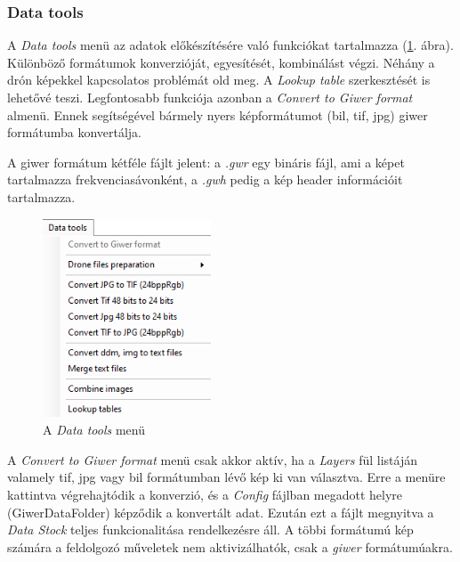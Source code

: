 \documentclass[a4paper,12pt]{article}
\begin{document}
\subsubsection{Data tools}

A \textit{Data tools} menü az adatok előkészítésére való funkciókat tartalmazza (\ref{fig:datatools_menu}. ábra). Különböző formátumok konverzióját, egyesítését, kombinálást végzi. Néhány a drón képekkel kapcsolatos problémát old meg. A \textit{Lookup table} szerkesztését is lehetővé teszi. Legfontosabb funkciója azonban a \textit{Convert to Giwer format} almenü. Ennek segítségével bármely nyers képformátumot (bil, tif, jpg) giwer formátumba konvertálja. 

A giwer formátum kétféle fájlt jelent: a \textit{.gwr} egy bináris fájl, ami a képet tartalmazza frekvenciasávonként, a \textit{.gwh} pedig a kép header információit tartalmazza.

	\begin{figure}
		\centering
		\includegraphics[width=5cm]{datatools_menu.png}
		\caption{A \textit{Data tools} menü}
		\label{fig:datatools_menu}
	\end{figure}


A \textit{Convert to Giwer format} menü csak akkor aktív, ha a \textit{Layers} fül listáján valamely tif, jpg vagy bil formátumban lévő kép ki van választva. Erre a menüre kattintva végrehajtódik a konverzió, és a \textit{Config} fájlban megadott helyre (GiwerDataFolder) képződik a konvertált adat. Ezután ezt a fájlt megnyitva a \textit{Data Stock} teljes funkcionalitása rendelkezésre áll. A többi formátumú kép számára a feldolgozó műveletek nem aktivizálhatók, csak a \textit{giwer} formátumúakra.
\end{document}
